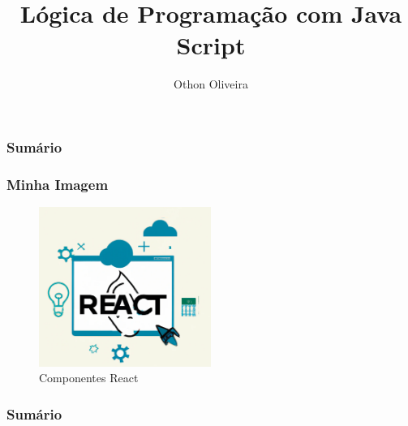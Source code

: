 \documentclass[13pt, xcolor={dvipsnames,svgnames}, portuguese]{beamer}
\author{Othon Oliveira}
\title{Lógica de Programação com Java Script}
\institute{SENAC - PROA}
\date{}
\begin{document}
\begin{frame}
\titlepage
\end{frame}

\newcommand{\capa}{
    \begin{tikzpicture}[remember picture,overlay]
        \node at (current page.south west)
            {\begin{tikzpicture}[remember picture, overlay]
                \fill[shading=radial,top color=orange,bottom color=orange,middle color=yellow] (0,0) rectangle (\paperwidth,\paperheight);
            \end{tikzpicture}
          };
    \end{tikzpicture}
}


\begin{frame}\frametitle{Sumário}
\tableofcontents
\end{frame}
\begin{frame}
\frametitle{Minha Imagem}
\begin{figure}
\centering
\includegraphics[width=0.5\textwidth]{Figuras/react1.png}
\caption{Componentes React}
\end{figure}
\end{frame}
\begin{frame}\frametitle{Sumário}
\tableofcontents
\end{frame}


\end{document}
